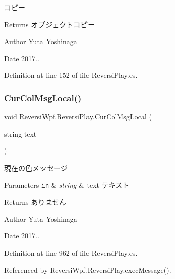 コピー 

\begin{DoxyReturn}{Returns}
オブジェクトコピー 
\end{DoxyReturn}
\begin{DoxyAuthor}{Author}
Yuta Yoshinaga 
\end{DoxyAuthor}
\begin{DoxyDate}{Date}
2017.. 
\end{DoxyDate}


Definition at line 152 of file Reversi\+Play.\+cs.

\mbox{\label{class_reversi_wpf_1_1_reversi_play_a009e9476a5ca008b66093f78132bb096}} 
\subsubsection{\texorpdfstring{Cur\+Col\+Msg\+Local()}{CurColMsgLocal()}}
{\footnotesize\ttfamily void Reversi\+Wpf.\+Reversi\+Play.\+Cur\+Col\+Msg\+Local (\begin{DoxyParamCaption}\item[{string}]{text }\end{DoxyParamCaption})\hspace{0.3cm}{\ttfamily [private]}}



現在の色メッセージ 


\begin{DoxyParams}[1]{Parameters}
\mbox{\tt in}  & {\em string} & text テキスト \\
\hline
\end{DoxyParams}
\begin{DoxyReturn}{Returns}
ありません 
\end{DoxyReturn}
\begin{DoxyAuthor}{Author}
Yuta Yoshinaga 
\end{DoxyAuthor}
\begin{DoxyDate}{Date}
2017.. 
\end{DoxyDate}


Definition at line 962 of file Reversi\+Play.\+cs.



Referenced by Reversi\+Wpf.\+Reversi\+Play.\+exec\+Message().

